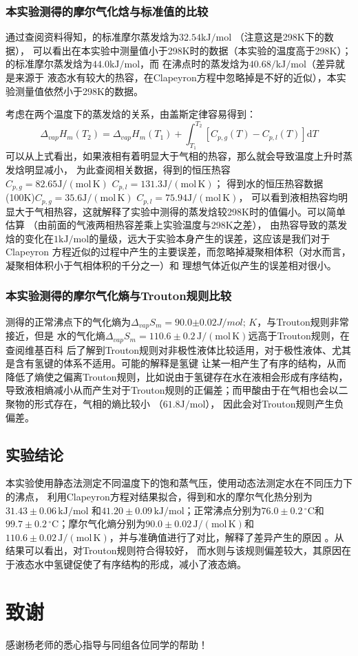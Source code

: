 \documentclass[12pt]{article}
\def\d{\mathrm{d}}  %
\newcommand{\mr}[1]{\mathrm{#1}}
\def\celsius{^{\circ}\mr{C}}  %
\begin{document}
 		\subsubsection{本实验测得的摩尔气化焓与标准值的比较}
		通过查阅资料得知\citealp{2012CRC}，的标准摩尔蒸发焓为$32.54\mr{kJ/mol}$
		（注意这是298K下的数据），
		可以看出在本实验中测量值小于298K时的数据（本实验的温度高于298K）；
		的标准摩尔蒸发焓为$44.0\mr{kJ/mol}$，而
		在沸点时的蒸发焓为$40.68/\mathrm{kJ/mol}$（差异就是来源于
		液态水有较大的热容，在Clapeyron方程中忽略掉是不好的近似），本实验测量值依然小于298K的数据。
		\par 考虑在两个温度下的蒸发焓的关系，由盖斯定律容易得到：
		\begin{equation}
			\Delta_{vap}H_{m}(T_2) = \Delta_{vap}H_{m}(T_1) + \int_{T_1}^{T_2}[C_{p,g}(T) - C_{p,l}(T)]\d T
		\end{equation}
		可以从上式看出，如果液相有着明显大于气相的热容，那么就会导致温度上升时蒸发焓明显减小，
		为此查阅相关数据\citealp{doi:10.1021/ja01235a002}，得到的恒压热容
		$C_{p,g} = 82.65\mr{J/(mol\,K)}\,\,C_{p,l} = 131.3\mr{J/(mol\,K)}$；
		得到水的恒压热容数据(100K)$C_{p,g} = 35.6\mr{J/(mol\,K)}\,\,C_{p,l} = 75.94\mr{J/(mol\,K)}$，
		可以看到液相热容均明显大于气相热容，这就解释了实验中测得的蒸发焓较298K时的值偏小。可以简单估算
		（由前面的气液两相热容差乘上实验温度与298K之差），
		由热容导致的蒸发焓的变化在$1\mr{kJ/mol}$的量级，远大于实验本身产生的误差，这应该是我们对于Clapeyron
		方程近似的过程中产生的主要误差，而忽略掉凝聚相体积（对水而言，凝聚相体积小于气相体积的千分之一）和
		理想气体近似产生的误差相对很小。

 	 	\subsubsection{本实验测得的摩尔气化熵与Trouton规则比较}
 	 	测得的正常沸点下的气化熵为$\Delta_{vap}S_{m} = 90.0\mr\pm0.02{J/mol;\,K}$，与Trouton规则非常接近，但是
		水的气化熵$\Delta_{vap}S_{m} = 110.6\pm0.2\,\mr{J/(mol\,K)}$远高于Trouton规则，在查阅维基百科
		后了解到Trouton规则对非极性液体比较适用，对于极性液体、尤其是含有氢键的体系不适用。可能的解释是氢键
		让某一相产生了有序的结构，从而降低了熵使之偏离Trouton规则，比如说由于氢键存在水在液相会形成有序结构，
		导致液相熵减小从而产生对于Trouton规则的正偏差；而甲酸由于在气相也会以二聚物的形式存在，气相的熵比较小
		（$61.8\mr{J/mol}$\citealt{formic_acid_wiki}），
		因此会对Trouton规则产生负偏差。
 	 	\subsection{实验结论}
 	 	本实验使用静态法测定不同温度下的饱和蒸气压，使用动态法测定水在不同压力下的沸点，
		利用Clapeyron方程对结果拟合，得到和水的摩尔气化热分别为$31.43\pm0.06\,\mr{kJ/mol}$
		和$41.20\pm0.09\,\mr{kJ/mol}$；正常沸点分别为$76.0\pm0.2\,\celsius$和
		$99.7\pm0.2\,\celsius$；摩尔气化熵分别为$90.0\pm0.02\,\mr{J/(mol\,K)}$和
		$110.6\pm0.02\,\mr{J/(mol\,K)}$，并与准确值进行了对比，解释了差异产生的原因
		。从结果可以看出，对Trouton规则符合得较好，
		而水则与该规则偏差较大，其原因在于液态水中氢键促使了有序结构的形成，减小了液态熵。
	\section{致谢}
	感谢杨老师的悉心指导与同组各位同学的帮助！
	\vbox{}  
	
	
\end{document}
